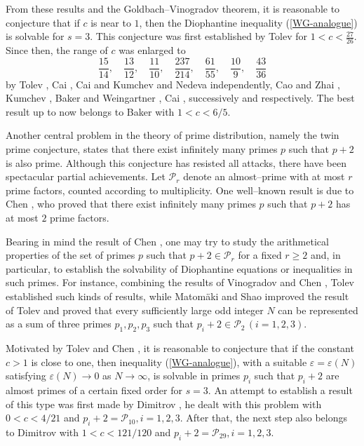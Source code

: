 \documentclass[a4paper,oneside,11pt]{article}%
\numberwithin{equation}{section}
\begin{document}
From these results and the Goldbach--Vinogradov theorem, it is reasonable to conjecture that if $c$ is near to $1$, then the Diophantine inequality (\ref{WG-analogue}) is solvable for $s=3$. This conjecture was first established by Tolev \cite{Tolev-thesis} for $1<c<\frac{27}{26}$. Since then, the range of $c$ was enlarged to
\begin{equation*}
\frac{15}{14},\quad   \frac{13}{12},\quad   \frac{11}{10},\quad   \frac{237}{214},\quad   \frac{61}{55},\quad   \frac{10}{9},\quad   \frac{43}{36}
\end{equation*}
by Tolev \cite{Tolev-1992}, Cai \cite{Cai-1996}, Cai \cite{Cai-1999} and Kumchev and Nedeva \cite{Kumchev-Nedeva-1998} independently, Cao and Zhai \cite{Cao-Zhai-2002}, Kumchev \cite{Kumchev-1999}, Baker and Weingartner \cite{Baker-Weingartner-2014}, Cai \cite{Cai-2018}, successively and respectively. The best result up to now belongs to
Baker \cite{Baker-2020} with $1<c<6/5$.



 Another central problem in the theory of prime distribution, namely the twin prime conjecture, states that there exist infinitely many primes $p$ such that $p+2$ is also prime. Although this conjecture has resisted all attacks, there have been spectacular partial achievements. Let $\mathcal{P}_r$ denote an almost--prime with at most $r$ prime factors, counted
according to multiplicity. One well--known result is due to Chen \cite{Chen-1966,Chen-1973}, who proved that there exist infinitely many primes $p$ such that $p+2$ has at most $2$ prime factors.

Bearing in mind the result of Chen \cite{Chen-1966,Chen-1973}, one may try to study the arithmetical properties of the set of primes $p$ such that $p+2\in\mathcal{P}_r$ for a fixed $r\geqslant2$ and, in particular, to establish the solvability of Diophantine equations or inequalities in such primes. For instance, combining the results of Vinogradov \cite{Vinogradov-1937}
and Chen \cite{Chen-1973}, Tolev \cite{Tolev-1999,Tolev-2000-1,Tolev-2000-2} established such kinds of results, while Matom\"{a}ki and Shao \cite{Matomaki-Shao-2017} improved the result of Tolev \cite{Tolev-2000-2} and proved that every sufficiently large odd integer $N$ can be represented as a sum of three primes $p_1,p_2,p_3$ such that
$p_i+2\in\mathcal{P}_2\,(i=1,2,3)$.

Motivated by Tolev \cite{Tolev-thesis,Tolev-1992} and Chen \cite{Chen-1966,Chen-1973}, it is reasonable to conjecture that if the constant $c>1$ is close to one, then inequality (\ref{WG-analogue}), with a suitable $\varepsilon=\varepsilon(N)$ satisfying $\varepsilon(N)\to0$ as $N\to\infty$, is solvable in primes $p_i$ such that $p_i+2$ are almost primes of a certain
fixed order for $s=3$. An attempt to establish a result of this type was first made by Dimitrov \cite{Dimitrov-2017-1}, he dealt with this problem with $0<c<4/21$ and $p_i+2=\mathcal{P}_{10}, i=1,2,3$. After that, the next step also belongs to Dimitrov \cite{Dimitrov-2017-2} with $1<c<121/120$ and $p_i+2=\mathcal{P}_{29}, i=1,2,3$.
\end{document}

